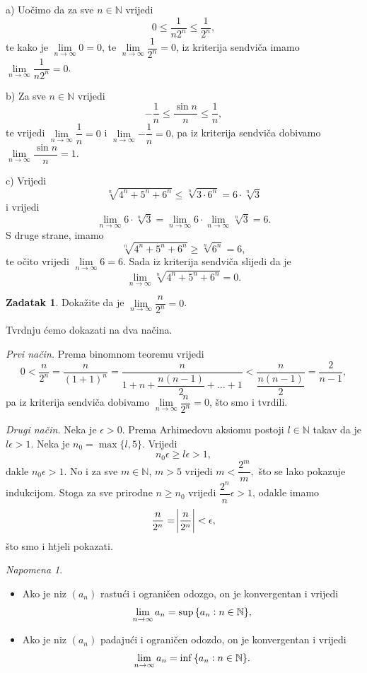 \documentclass{book}
\let\originalleft\left
\let\originalright\right
\renewcommand{\left}{\mathopen{}\mathclose\bgroup\originalleft}
\renewcommand{\right}{\aftergroup\egroup\originalright}
\renewenvironment{proof}{%
    \vspace{-\parskip}\begin{oldproof}%
    }{%
    \end{oldproof}%
}
\theoremstyle{definition}
\theoremstyle{definition}
\newtheorem{exercise}{Zadatak}
\theoremstyle{remark}
\newtheorem{remark}{Napomena}
\begin{document}
\begin{proof}[Rješenje]
a) Uočimo da za sve $n\in \mathbb{N}$ vrijedi
$$0\leq \dfrac{1}{n2^n}\leq \dfrac{1}{2^n},$$
te kako je $\lim\limits_{n\to \infty}{0}=0$, te $\lim\limits_{n\to \infty}{\dfrac{1}{2^n}}=0$, iz kriterija sendviča imamo $\lim\limits_{n\to \infty}{\dfrac{1}{n2^n}}=0$.

b) Za sve $n\in \mathbb{N}$ vrijedi
$$-\dfrac{1}{n}\leq \dfrac{\sin{n}}{n}\leq \dfrac{1}{n},$$
te vrijedi $\lim\limits_{n\to \infty}{\dfrac{1}{n}}=0$ i $\lim\limits_{n\to \infty}{-\dfrac{1}{n}}=0$, pa iz kriterija sendviča dobivamo $\lim\limits_{n\to \infty}{\dfrac{\sin{n}}{n}}=1$.

c) Vrijedi $$\sqrt[n]{4^n+5^n+6^n}\leq \sqrt[n]{3\cdot 6^n}=6\cdot \sqrt[n]{3}$$ i vrijedi $$\lim\limits_{n\to \infty}{6\cdot \sqrt[n]{3}}=\lim\limits_{n\to \infty}{6}\cdot \lim\limits_{n\to \infty}{\sqrt[n]{3}}=6.$$ S druge strane, imamo $$\sqrt[n]{4^n+5^n+6^n}\geq \sqrt[n]{6^n}=6,$$ 
te očito vrijedi $\lim\limits_{n\to \infty}{6}=6$. Sada iz kriterija sendviča slijedi da je $$\lim\limits_{n\to \infty}{\sqrt[n]{4^n+5^n+6^n}}=0.$$
\end{proof}
\begin{exercise}
\label{7}
Dokažite da je $\lim\limits_{n\to \infty}{\dfrac{n}{2^n}}=0$.
\end{exercise}
\begin{proof}[Rješenje] Tvrdnju ćemo dokazati na dva načina.

\textit{Prvi način.} Prema binomnom teoremu vrijedi
$$0<\dfrac{n}{2^n}=\dfrac{n}{(1+1)^n}=\dfrac{n}{1+n+\dfrac{n(n-1)}{2}+\dots+1}<\dfrac{n}{\dfrac{n(n-1)}{2}}=\dfrac{2}{n-1},$$
pa iz kriterija sendviča dobivamo $\lim\limits_{n\to \infty}{\dfrac{n}{2^n}}=0$, što smo i tvrdili.

\textit{Drugi način.} Neka je $\epsilon>0$. Prema Arhimedovu aksiomu postoji $l\in \mathbb{N}$ takav da je $l\epsilon>1$. Neka je $n_0=\max\{l, 5\}$. Vrijedi
$$n_0\epsilon\geq l\epsilon>1,$$
dakle $n_0\epsilon>1$. No i za sve $m\in \mathbb{N}$, $m>5$ vrijedi $m<\dfrac{2^m}{m},$ što se lako pokazuje indukcijom. Stoga za sve prirodne $n\geq n_0$ vrijedi $\dfrac{2^{n}}{n}\epsilon>1$, odakle imamo $$\dfrac{n}{2^n}=\abs{\dfrac{n}{2^n}}<\epsilon,$$
što smo i htjeli pokazati.
\end{proof}
\begin{remark} \textbf{}
\label{suffcond}
\begin{itemize}
\item Ako je niz $(a_n)$ rastući i ograničen odozgo, on je konvergentan i vrijedi $$\lim\limits_{n\to\infty}{a_n}=\sup{\left\{a_n : n\in \mathbb{N}\right\}},$$
\item Ako je niz $(a_n)$ padajući i ograničen odozdo, on je konvergentan i vrijedi $$\lim\limits_{n\to\infty}{a_n}=\inf{\left\{a_n : n\in \mathbb{N}\right\}}.$$
\end{itemize}
\end{remark}
\end{document}

